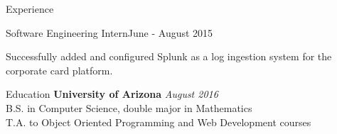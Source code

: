 \documentclass{resume} %
\begin{document}
\begin{rSection}{Experience}
\begin{rSmallSubsection}{Software Engineering Intern}{June - August 2015}
\item Successfully added and configured Splunk as a log ingestion system for the corporate card platform.
\end{rSmallSubsection}

\end{rSection}

\begin{rSection}{Education}
	{\bf\large University of Arizona} \hfill {\em\large August 2016} \\
	\large B.S. in Computer Science, double major in Mathematics \\
	\smallskip T.A. to Object Oriented Programming and Web Development courses
\end{rSection}
\end{document}
